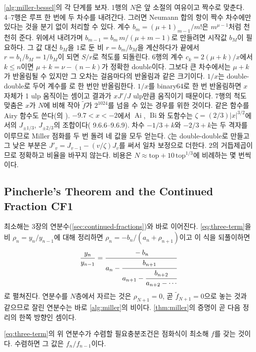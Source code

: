 \cref{alg:miller-bessel}의 각 단계를 보자. 1행의 $N$은 앞 소절의 여유이고 짝수로 맞춘다. 4--7행은 루프 한 번에 두 차수를 내려간다. 그러면 Neumann 합의 항이 짝수 차수에만 있다는 것을 분기 없이 처리할 수 있다. 계수 $b_m=(\mu+1)_{m-1}/m!$은 $m^{\mu-1}$처럼 천천히 준다. 위에서 내려가며 $b_{m-1}=b_m\,m/(\mu+m-1)$로 만들려면 시작값 $b_M$이 필요하다. 그 값 대신 $b_M$을 $1$로 둔 비 $r=b_m/b_M$을 계산하다가 끝에서 $r=b_1/b_M=1/b_M$이 되면 $S/r$로 척도를 되돌린다. 6행의 계수 $c_k=2(\mu+k)/x$에서 $k\le n$이면 $\mu+k=\nu-(n-k)$가 정확한 double이다. 그보다 큰 차수에서는 $\mu+k$가 반올림될 수 있지만 그 오차는 걸음마다의 반올림과 같은 크기이다. $1/x$는 double-double로 두어 계수를 로 한 번만 반올림한다. $1/x$를 binary64로 한 번 반올림하면 $x$ 자체가 1 ulp 움직이는 셈이고 결과가 $xJ'/J$ ulp만큼 움직이기 때문이다. 7행의 척도 맞춤은 $x$가 $N$에 비해 작아 $\tilde f$가 $2^{1024}$를 넘을 수 있는 경우를 위한 것이다. 같은 함수를 Airy 함수도 쓴다(의 ). $-9.7<x<-2$에서 $\operatorname{Ai}$, $\operatorname{Bi}$와 도함수는 $\zeta=(2/3)|x|^{3/2}$에서의 $J_{\pm1/3}$, $J_{\pm2/3}$의 조합이다(\cite{dlmf} 9.6.6--9.6.9). 차수 $-1/3+k$와 $-2/3+k$는 두 격자를 이루므로 Miller 점화를 두 번 돌려 네 값을 모두 얻는다. $\zeta$는 double-double로 만들고 그 낮은 부분은 $J'_v=J_{v-1}-(v/\zeta)J_v$를 써서 일차 보정으로 더한다. $2$의 거듭제곱이므로 정확하고 비율을 바꾸지 않는다. 비용은 $N\approx\mathrm{top}+10\,\mathrm{top}^{1/3}$에 비례하는  몇 번씩이다.

\subsection{Pincherle's Theorem and the Continued Fraction CF1}

최소해는 3장의 연분수(\cref{sec:continued-fractions})와 바로 이어진다. \cref{eq:three-term}을 비 $\rho_n=y_n/y_{n-1}$에 대해 정리하면 $\rho_n=-b_n/(a_n+\rho_{n+1})$이고 이 식을 되풀이하면
\[
\frac{y_n}{y_{n-1}}=\cfrac{-b_n}{a_n-\cfrac{b_{n+1}}{a_{n+1}-\cfrac{b_{n+2}}{a_{n+2}-\cdots}}}
\]
로 펼쳐진다. 연분수를 $N$층에서 자르는 것은 $\rho_{N+1}=0$, 곧 $\tilde f_{N+1}=0$으로 놓는 것과 같으므로 잘린 연분수는 바로 \cref{alg:miller}의 비이다. \cref{thm:miller}의 증명이 곧 다음 정리의 한쪽 방향인 셈이다.

\begin{theorem}[Pincherle]
\label{thm:pincherle}
\cref{eq:three-term}의 위 연분수가 수렴할 필요충분조건은 점화식이 최소해 $f$를 갖는 것이다. 수렴하면 그 값은 $f_n/f_{n-1}$이다.
\end{theorem}

